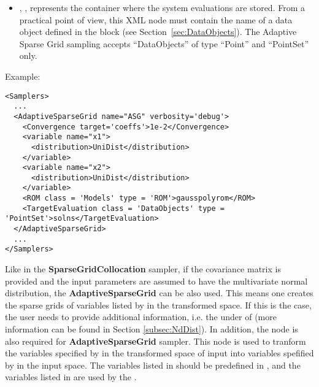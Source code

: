         \begin{itemize}
      \item {}, ,
        represents the container where the system evaluations are stored.
        From a practical point of view, this XML node must contain the name of
        a data object defined in the  block (see
        Section~\ref{sec:DataObjects}).
        The Adaptive Sparse Grid sampling accepts ``DataObjects'' of type ``Point'' and
        ``PointSet'' only.
\end{itemize}

Example:
\begin{lstlisting}[style=XML,morekeywords={class,limit,subGridTol,weight,persistence}]
<Samplers>
  ...
  <AdaptiveSparseGrid name="ASG" verbosity='debug'>
    <Convergence target='coeffs'>1e-2</Convergence>
    <variable name="x1">
      <distribution>UniDist</distribution>
    </variable>
    <variable name="x2">
      <distribution>UniDist</distribution>
    </variable>
    <ROM class = 'Models' type = 'ROM'>gausspolyrom</ROM>
    <TargetEvaluation class = 'DataObjects' type = 'PointSet'>solns</TargetEvaluation>
  </AdaptiveSparseGrid>
  ...
</Samplers>
\end{lstlisting}

Like in the \textbf{SparseGridCollocation} sampler, if the covariance matrix is provided 
and the input parameters are assumed to have the multivariate normal distribution, the \textbf{AdaptiveSparseGrid} can be also used.
This means one creates the sparse grids of variables listed by  in the transformed space. If this is 
the case, the user needs to provide additional information, i.e. the  under  
of  (more information can be found in Section \ref{subsec:NdDist}). In addition, the node 
 is also required for \textbf{AdaptiveSparseGrid} sampler. This node is used to tranform 
the variables specified by  in the transformed space of input into variables spefified by 
 in the input space. The variables listed in  should be predefined 
in , and the variables listed in  
are used by the .

